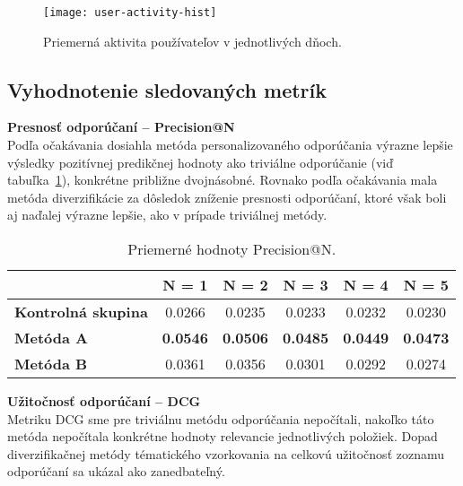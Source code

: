 \begin{figure}[H]\begin{center}
\texttt{[image: user-activity-hist]}
\caption{Priemerná aktivita používateľov v jednotlivých dňoch. \label{fig:user-act-hist}}\end{center}
\end{figure}



\subsection{Vyhodnotenie sledovaných metrík}

\textbf{Presnosť odporúčaní -- Precision@N}\\
Podľa očakávania dosiahla metóda personalizovaného odporúčania výrazne lepšie výsledky pozitívnej predikčnej hodnoty
ako triviálne odporúčanie (viď tabuľka~\ref{tab:pan}), konkrétne približne dvojnásobné. Rovnako podľa očakávania mala
metóda diverzifikácie za dôsledok zníženie presnosti odporúčaní, ktoré však boli aj naďalej výrazne lepšie,
ako v prípade triviálnej metódy.

\begin{table}[H]
\centering
\caption{Priemerné hodnoty Precision@N.}
\label{tab:pan}
\begin{tabular}{|l|c|c|c|c|c|}
\hline
                           & \textbf{N = 1}  & \textbf{N = 2}  & \textbf{N = 3}  & \textbf{N = 4}  & \textbf{N = 5}  \\ \hline
\textbf{Kontrolná skupina} & 0.0266          & 0.0235          & 0.0233          & 0.0232          & 0.0230          \\ \hline
\textbf{Metóda A}          & \textbf{0.0546} & \textbf{0.0506} & \textbf{0.0485} & \textbf{0.0449} & \textbf{0.0473} \\ \hline
\textbf{Metóda B}          & 0.0361          & 0.0356          & 0.0301          & 0.0292          & 0.0274          \\ \hline
\end{tabular}
\end{table}


\textbf{Užitočnosť odporúčaní -- DCG}\\
Metriku DCG sme pre triviálnu metódu odporúčania nepočítali, nakoľko táto metóda nepočítala konkrétne hodnoty relevancie
jednotlivých položiek. Dopad diverzifikačnej metódy tématického vzorkovania na celkovú užitočnosť zoznamu odporúčaní sa ukázal
ako zanedbateľný.

